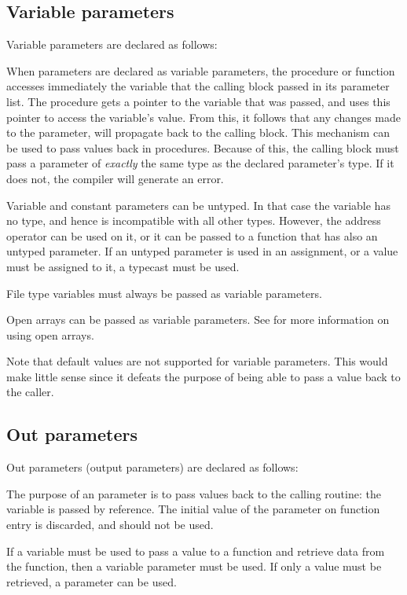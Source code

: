 \subsection{Variable parameters}
\label{se:varparams}
Variable parameters are declared as follows:

When parameters are declared as variable parameters, the procedure or
function accesses immediately the variable that the calling block passed in
its parameter list. The procedure gets a pointer to the variable that was
passed, and uses this pointer to access the variable's value.
From this, it follows that any changes made to the parameter, will
propagate back to the calling block. This mechanism can be used to pass
values back in procedures.
Because of this, the calling block must pass a parameter of {\em exactly}
the same type as the declared parameter's type. If it does not, the compiler
will generate an error.

Variable and constant parameters can be untyped. In that case the variable has no type,
and hence is incompatible with all other types. However, the address operator
can be used on it, or it can be passed to a function that has also an
untyped parameter. If an untyped parameter is used in an assignment,
or a value must be assigned to it, a typecast must be used.

File type variables must always be passed as variable parameters.

Open arrays can be passed as variable parameters. See  for
more information on using open arrays.

Note that default values are not supported for variable parameters. This
would make little sense since it defeats the purpose of being able to pass a
value back to the caller.

\subsection{Out parameters}
\label{se:outparams}
Out parameters  (output parameters) are declared as follows:

The purpose of an  parameter is to pass values back to the calling
routine: the variable is passed by reference. The initial value of the 
parameter on function entry is discarded, and should not be used.

If a variable must be used to pass a value to a function and retrieve data
from the function, then a variable parameter must be used. If only a value
must be retrieved, a  parameter can be used.

